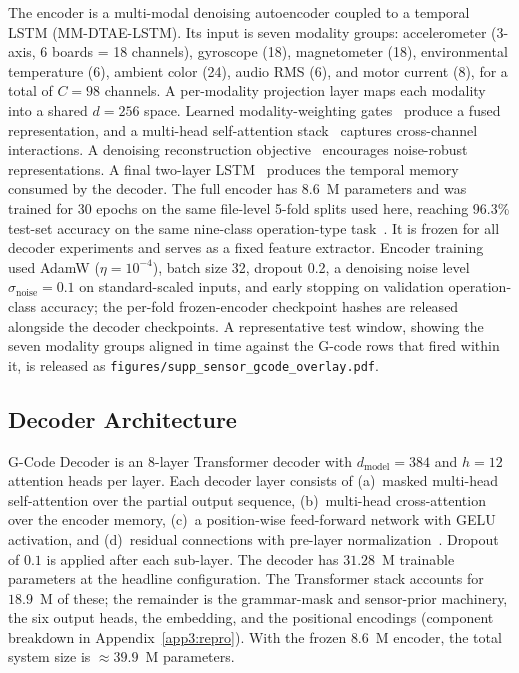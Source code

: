 \documentclass[sensors,article,submit,moreauthors,pdftex]{Definitions/mdpi}
\newcommand{\modelname}{G-Code Decoder}
\newcommand{\encname}{MM-DTAE-LSTM}
\begin{document}
The encoder is a multi-modal denoising autoencoder coupled to a temporal LSTM (\encname{}). Its input is seven modality groups: accelerometer (3-axis, 6 boards = 18 channels), gyroscope (18), magnetometer (18), environmental temperature (6), ambient color (24), audio RMS (6), and motor current (8), for a total of $C=98$ channels. A per-modality projection layer maps each modality into a shared $d=256$ space. Learned modality-weighting gates~\cite{lahat2015multimodal,ramachandram2017deep} produce a fused representation, and a multi-head self-attention stack~\cite{vaswani2017attention} captures cross-channel interactions. A denoising reconstruction objective~\cite{vincent2010stacked} encourages noise-robust representations. A final two-layer LSTM~\cite{hochreiter1997long,malhotra2015lstm} produces the temporal memory consumed by the decoder. The full encoder has 8.6~M parameters and was trained for 30 epochs on the same file-level 5-fold splits used here, reaching 96.3\% test-set accuracy on the same nine-class operation-type task~\cite{encoder_paper}. It is frozen for all decoder experiments and serves as a fixed feature extractor. Encoder training used AdamW ($\eta\!=\!10^{-4}$), batch size 32, dropout 0.2, a denoising noise level $\sigma_{\text{noise}}\!=\!0.1$ on standard-scaled inputs, and early stopping on validation operation-class accuracy; the per-fold frozen-encoder checkpoint hashes are released alongside the decoder checkpoints. A representative test window, showing the seven modality groups aligned in time against the G-code rows that fired within it, is released as \texttt{figures/supp\_sensor\_gcode\_overlay.pdf}.

\subsection{Decoder Architecture}
\label{sec:decoder}

\modelname{} is an 8-layer Transformer decoder with $d_{\text{model}}=384$ and $h=12$ attention heads per layer. Each decoder layer consists of (a)~masked multi-head self-attention over the partial output sequence, (b)~multi-head cross-attention over the encoder memory, (c)~a position-wise feed-forward network with GELU activation, and (d)~residual connections with pre-layer normalization~\cite{ba2016layernorm}. Dropout~\cite{srivastava2014dropout} of $0.1$ is applied after each sub-layer. The decoder has $31.28$~M trainable parameters at the headline configuration. The Transformer stack accounts for $18.9$~M of these; the remainder is the grammar-mask and sensor-prior machinery, the six output heads, the embedding, and the positional encodings (component breakdown in Appendix~\ref{app3:repro}). With the frozen $8.6$~M encoder, the total system size is $\approx\!39.9$~M parameters.
\end{document}
